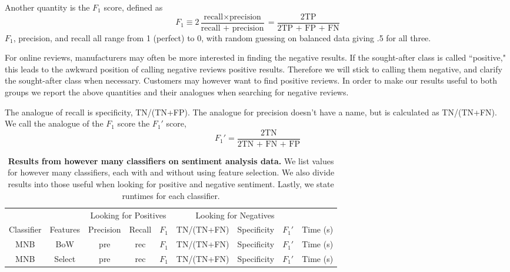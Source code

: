 \documentclass{article} %
\begin{document}
	Another quantity is the $F_1$ score, defined as
	\begin{equation}
	F_1 \equiv 2\frac{\mbox{recall}\times\mbox{precision}}{\mbox{recall +
			precision}} = \frac{\mbox{2TP}}{\mbox{2TP + FP + FN}}
	\end{equation}
	$F_1$, precision, and recall all range from 1 (perfect) to 0, with random guessing on balanced data giving .5 for all three.
	
	For online reviews, manufacturers may often be more interested in finding the negative results. If the sought-after class is called ``positive," this leads to the awkward position of calling negative reviews positive results. Therefore we will stick to calling them negative, and clarify the sought-after class when necessary. Customers may however want to find positive reviews. In order to make our results useful to both groups we report the above quantities and their analogues when searching for negative reviews.
	
	The analogue of recall is specificity, TN/(TN+FP). The analogue for precision doesn't have a name, but is calculated as TN/(TN+FN). We call the analogue of the $F_1$ score the $F_1'$ score,
	\begin{equation}
	F_1' = \frac{\mbox{2TN}}{\mbox{2TN + FN + FP}}
	\end{equation}
	
	\begin{table}[h]
		\centering
		\begin{tabular}[]{@{}|c|c|c|c|c|c|c|c|c|@{}}
			\hline
			\multicolumn{2}{|c|}{} & \multicolumn{3}{c}{Looking for Positives} & \multicolumn{3}{c}{Looking for Negatives} &\\
			\cline{3-9}
			Classifier& Features& Precision& Recall& $F_1$& TN/(TN+FN)& Specificity & $F_1'$ & Time (s)\\
			\hline
			\hline
			MNB & BoW  & pre & rec & $F_1$& TN/(TN+FN)& Specificity & $F_1'$ & Time (s)\\
			MNB & Select & pre & rec & $F_1$& TN/(TN+FN)& Specificity & $F_1'$ & Time (s)\\
			\hline
		\end{tabular}
		\caption{{\bf Results from however many classifiers on sentiment analysis data.} We list values for however many classifiers, each with and without using feature selection. We also divide results into those useful when looking for positive and negative sentiment. Lastly, we state runtimes for each classifier.}
		\label{tab:results}
	\end{table}
\end{document}
